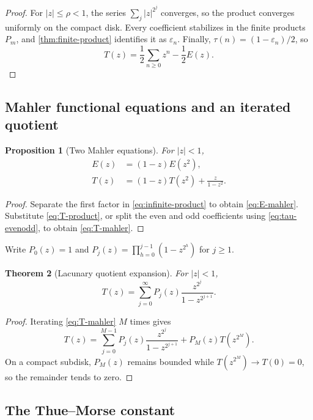 \documentclass[11pt,oneside]{article}
\newtheorem{theorem}{Theorem}[section]
\newtheorem{proposition}[theorem]{Proposition}
\theoremstyle{definition}
\theoremstyle{remark}
\newcommand{\eps}{\varepsilon}
\newcommand{\1}{\mathbf 1}
\begin{document}
\begin{proof}
For \(|z|\le\rho<1\), the series \(\sum_j|z|^{2^j}\) converges, so the product converges
uniformly on the compact disk.  Every coefficient stabilizes in the finite products
\(P_m\), and \cref{thm:finite-product} identifies it as \(\eps_n\).  Finally,
\(\tau(n)=(1-\eps_n)/2\), so
\[
 T(z)=\frac12\sum_{n\ge0}z^n-\frac12E(z).
\]
\end{proof}

\subsection{Mahler functional equations and an iterated quotient}

\begin{proposition}[Two Mahler equations]
\label{prop:mahler}
For \(|z|<1\),
\begin{align}
 E(z)&=(1-z)E(z^2),                                      \label{eq:E-mahler}\\
 T(z)&=(1-z)T(z^2)+\frac{z}{1-z^2}.                      \label{eq:T-mahler}
\end{align}
\end{proposition}

\begin{proof}
Separate the first factor in \eqref{eq:infinite-product} to obtain
\eqref{eq:E-mahler}.  Substitute \eqref{eq:T-product}, or split the even and odd
coefficients using \eqref{eq:tau-evenodd}, to obtain \eqref{eq:T-mahler}.
\end{proof}

Write \(P_0(z)=1\) and \(P_j(z)=\prod_{h=0}^{j-1}(1-z^{2^h})\) for \(j\ge1\).

\begin{theorem}[Lacunary quotient expansion]
\label{thm:lacunary-quotient}
For \(|z|<1\),
\begin{equation}
 \boxed{
 T(z)=\sum_{j=0}^{\infty}
 P_j(z)\frac{z^{2^j}}{1-z^{2^{j+1}}}.}
 \label{eq:lacunary-quotient}
\end{equation}
\end{theorem}

\begin{proof}
Iterating \eqref{eq:T-mahler} \(M\) times gives
\[
 T(z)=\sum_{j=0}^{M-1}P_j(z)\frac{z^{2^j}}{1-z^{2^{j+1}}}
      +P_M(z)T(z^{2^M}).
\]
On a compact subdisk, \(P_M(z)\) remains bounded while \(T(z^{2^M})\to T(0)=0\), so the
remainder tends to zero.
\end{proof}

\subsection{The Thue--Morse constant}
\end{document}
